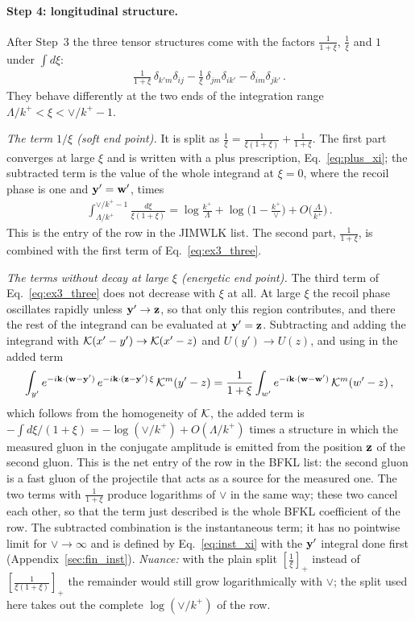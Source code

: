 \paragraph{Step 4: longitudinal structure.} After Step~3 the three tensor structures come with the factors $\frac{1}{1+\xi}$, $\frac1\xi$ and $1$ under $\int d\xi$:
\begin{align}\label{eq:ex3_three}
\frac{1}{1+\xi}\,\delta_{k'm}\delta_{ij}-\frac1\xi\,\delta_{jm}\delta_{ik'}-\delta_{im}\delta_{jk'}\,.
\end{align}
They behave differently at the two ends of the integration range $\Lambda/k^+<\xi<\vee/k^+-1$.

\emph{The term $1/\xi$ (soft end point).} It is split as $\frac1\xi=\frac{1}{\xi(1+\xi)}+\frac{1}{1+\xi}$. The first part converges at large $\xi$ and is written with a plus prescription, Eq.~\eqref{eq:plus_xi}; the subtracted term is the value of the whole integrand at $\xi=0$, where the recoil phase is one and $\mathbf{y}'=\mathbf{w}'$, times
\begin{align}
\int_{\Lambda/k^+}^{\vee/k^+-1}\frac{d\xi}{\xi(1+\xi)}=\log\frac{k^+}{\Lambda}+\log\Big(1-\frac{k^+}{\vee}\Big)+O\Big(\frac{\Lambda}{k^+}\Big)\,.
\end{align}
This is the entry of the row in the JIMWLK list. The second part, $\frac{1}{1+\xi}$, is combined with the first term of Eq.~\eqref{eq:ex3_three}.

\emph{The terms without decay at large $\xi$ (energetic end point).} The third term of Eq.~\eqref{eq:ex3_three} does not decrease with $\xi$ at all. At large $\xi$ the recoil phase oscillates rapidly unless $\mathbf{y}'\to\mathbf{z}$, so that only this region contributes, and there the rest of the integrand can be evaluated at $\mathbf{y}'=\mathbf{z}$. Subtracting and adding the integrand with $\mathcal{K}(x'-y')\to\mathcal{K}(x'-z)$ and $U(y')\to U(z)$, and using in the added term
\begin{align}\label{eq:ex3_FT}
\int_{y'}e^{-i\mathbf{k}\cdot(\mathbf{w}-\mathbf{y}')}\,e^{-i\mathbf{k}\cdot(\mathbf{z}-\mathbf{y}')\,\xi}\,\mathcal{K}^m(y'-z)=\frac{1}{1+\xi}\int_{w'}e^{-i\mathbf{k}\cdot(\mathbf{w}-\mathbf{w}')}\,\mathcal{K}^m(w'-z)\,,
\end{align}
which follows from the homogeneity of $\mathcal{K}$, the added term is $-\int d\xi/(1+\xi)=-\log(\vee/k^+)+O(\Lambda/k^+)$ times a structure in which the measured gluon in the conjugate amplitude is emitted from the position $\mathbf{z}$ of the second gluon. This is the net entry of the row in the BFKL list: the second gluon is a fast gluon of the projectile that acts as a source for the measured one. The two terms with $\frac{1}{1+\xi}$ produce logarithms of $\vee$ in the same way; these two cancel each other, so that the term just described is the whole BFKL coefficient of the row. The subtracted combination is the instantaneous term; it has no pointwise limit for $\vee\to\infty$ and is defined by Eq.~\eqref{eq:inst_xi} with the $\mathbf{y}'$ integral done first (Appendix~\ref{sec:fin_inst}). \emph{Nuance:} with the plain split $[\frac1\xi]_+$ instead of $[\frac{1}{\xi(1+\xi)}]_+$ the remainder would still grow logarithmically with $\vee$; the split used here takes out the complete $\log(\vee/k^+)$ of the row.

